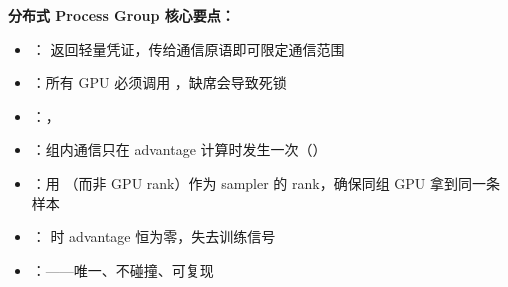 \begin{summarybox}
\textbf{分布式 Process Group 核心要点：}
\begin{itemize}[leftmargin=1.5em]
  \item {}： 返回轻量凭证，传给通信原语即可限定通信范围
  \item {}：所有 GPU 必须调用 ，缺席会导致死锁
  \item {}：，
  \item {}：组内通信只在 advantage 计算时发生一次（）
  \item {}：用 （而非 GPU rank）作为 sampler 的 rank，确保同组 GPU 拿到同一条样本
  \item {}： 时 advantage 恒为零，失去训练信号
  \item {}：——唯一、不碰撞、可复现
\end{itemize}
\end{summarybox}
